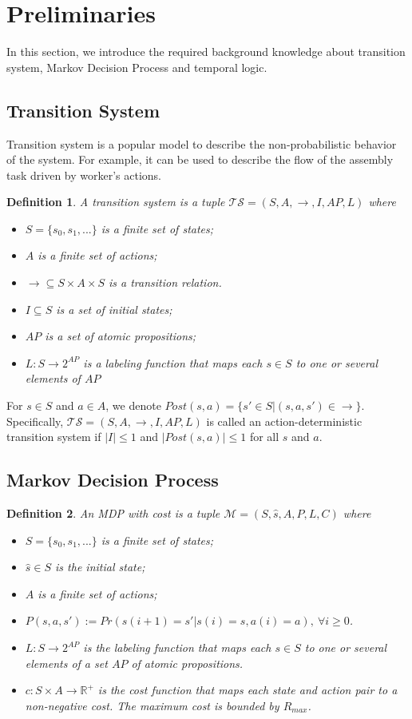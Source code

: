 \documentclass[journal]{IEEEtran}
\newtheorem{definition}{Definition}
\begin{document}
\section{Preliminaries}\label{sec:preliminaries}
In this section, we introduce the required background knowledge about transition system, Markov Decision Process and temporal logic. 
\subsection{Transition System}
Transition system is a popular model to describe the non-probabilistic behavior of the system. For example, it can be used to describe the flow of the assembly task driven by worker's actions.
\begin{definition}\cite{baier2008principles}
	A transition system is a tuple $\mathcal{TS}=(S,A,\rightarrow,I,AP,L)$ where
	\begin{itemize}
		\item $S=\{s_0,s_1,...\}$ is a finite set of states;
		\item $A$ is a finite set of actions;
		\item $\rightarrow\subseteq S\times A\times S$ is a transition relation.
		\item $I\subseteq S$ is a set of initial states;
		\item $AP$ is a set of atomic propositions;
		\item $L:S\rightarrow2^{AP}$ is a labeling function that maps each $s\in S$ to one or several elements of $AP$
	\end{itemize}
\end{definition}
For $s\in S$ and $a\in A$, we denote $Post(s,a)=\{s'\in S|(s,a,s')\in \rightarrow\}$. Specifically, $\mathcal{TS}=(S,A,\rightarrow,I,AP,L)$ is called an action-deterministic transition system if $|I|\leq 1$ and $|Post(s,a)|\leq 1$ for all $s$ and $a$. 
\subsection{Markov Decision Process}

\begin{definition}\label{def:MDP}\cite{baier2008principles}
	An MDP with cost is a tuple $\mathcal{M}=(S,\hat{s},A,P,L,C)$ where
	\begin{itemize}
		\item $S=\{s_0,s_1,...\}$ is a finite set of states;
		\item $\hat{s}\in S$ is the initial state;
		\item $A$ is a finite set of actions;
		\item $P(s,a,s'):=Pr(s(i+1)=s'|s(i)=s,a(i)=a),~\forall i\geq0$.
		\item $L:S\rightarrow2^{AP}$ is the labeling function that maps each $s\in S$ to one or several elements of a set $AP$ of atomic propositions.
		\item $c:S\times A\rightarrow\mathbb{R}^+$ is the cost function that maps each state and action pair to a non-negative cost. The maximum cost is bounded by $R_{max}$.
	\end{itemize}
\end{definition}
\end{document}
